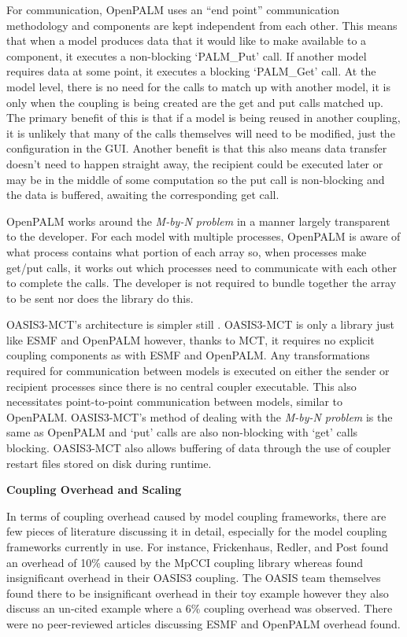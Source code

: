 For communication, OpenPALM uses an ``end point'' communication methodology
\cite{CERFACS2007} and components are kept independent from each other. This
means that when a model produces data that it would like to make available to a
component, it executes a non-blocking `PALM\_Put' call. If another model
requires data at some point, it executes a blocking `PALM\_Get' call. At the
model level, there is no need for the calls to match up with another model, it
is only when the coupling is being created are the get and put calls matched up.
The primary benefit of this is that if a model is being reused in another
coupling, it is unlikely that many of the calls themselves will need to be
modified, just the configuration in the GUI. Another benefit is that this also
means data transfer doesn't need to happen straight away, the recipient could be
executed later or may be in the middle of some computation so the put call is
non-blocking and the data is buffered, awaiting the corresponding get call.

OpenPALM works around the \textit{M-by-N problem} in a manner largely
transparent to the developer. For each model with multiple processes, OpenPALM
is aware of what process contains what portion of each array so, when processes
make get/put calls, it works out which processes need to communicate with each
other to complete the calls. The developer is not required to bundle together
the array to be sent nor does the library do this.

OASIS3-MCT's architecture is simpler still \cite{OASIS3-MCT2013}. OASIS3-MCT is
only a library just like ESMF and OpenPALM however, thanks to MCT, it requires
no explicit coupling components as with ESMF and OpenPALM. Any transformations
required for communication between models is executed on either the sender or
recipient processes since there is no central coupler executable. This also
necessitates point-to-point communication between models, similar to OpenPALM.
OASIS3-MCT's method of dealing with the \textit{M-by-N problem} is the same as
OpenPALM and `put' calls are also non-blocking with `get' calls blocking.
OASIS3-MCT also allows buffering of data through the use of coupler restart
files stored on disk during runtime.

\textbf{Coupling Overhead and Scaling}

In terms of coupling overhead caused by model coupling frameworks, there are few
pieces of literature discussing it in detail, especially for the model coupling
frameworks currently in use. For instance, Frickenhaus, Redler, and Post
\cite{StephanFrickenhausReneRedler2001} found an overhead of 10\% caused by the
MpCCI coupling library whereas \cite{Mogensen} found insignificant overhead in
their OASIS3 coupling. The OASIS team themselves found there to be insignificant
overhead in their toy example \cite{Valcke} however they also discuss an
un-cited example where a 6\% coupling overhead was observed. There were no
peer-reviewed articles discussing ESMF and OpenPALM overhead found.

